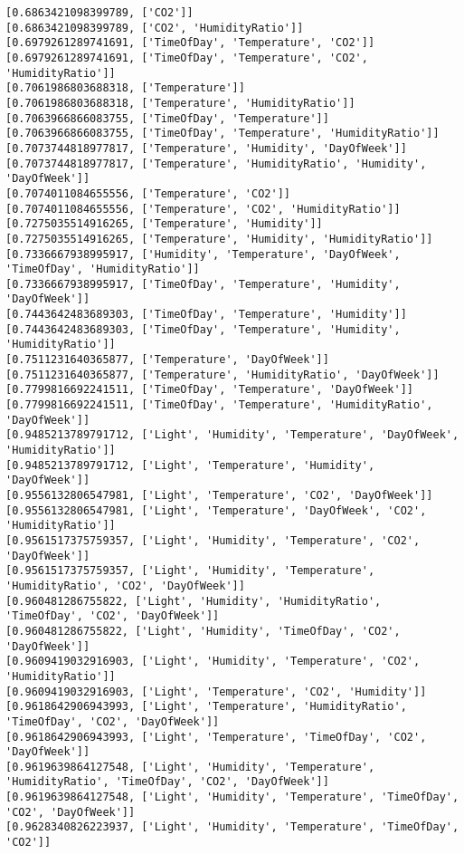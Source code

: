 \documentclass[11pt]{article}
\begin{document}
\begin{Verbatim}[commandchars=\\\{\}]
[0.6863421098399789, ['CO2']]
[0.6863421098399789, ['CO2', 'HumidityRatio']]
[0.6979261289741691, ['TimeOfDay', 'Temperature', 'CO2']]
[0.6979261289741691, ['TimeOfDay', 'Temperature', 'CO2', 'HumidityRatio']]
[0.7061986803688318, ['Temperature']]
[0.7061986803688318, ['Temperature', 'HumidityRatio']]
[0.7063966866083755, ['TimeOfDay', 'Temperature']]
[0.7063966866083755, ['TimeOfDay', 'Temperature', 'HumidityRatio']]
[0.7073744818977817, ['Temperature', 'Humidity', 'DayOfWeek']]
[0.7073744818977817, ['Temperature', 'HumidityRatio', 'Humidity', 'DayOfWeek']]
[0.7074011084655556, ['Temperature', 'CO2']]
[0.7074011084655556, ['Temperature', 'CO2', 'HumidityRatio']]
[0.7275035514916265, ['Temperature', 'Humidity']]
[0.7275035514916265, ['Temperature', 'Humidity', 'HumidityRatio']]
[0.7336667938995917, ['Humidity', 'Temperature', 'DayOfWeek', 'TimeOfDay', 'HumidityRatio']]
[0.7336667938995917, ['TimeOfDay', 'Temperature', 'Humidity', 'DayOfWeek']]
[0.7443642483689303, ['TimeOfDay', 'Temperature', 'Humidity']]
[0.7443642483689303, ['TimeOfDay', 'Temperature', 'Humidity', 'HumidityRatio']]
[0.7511231640365877, ['Temperature', 'DayOfWeek']]
[0.7511231640365877, ['Temperature', 'HumidityRatio', 'DayOfWeek']]
[0.7799816692241511, ['TimeOfDay', 'Temperature', 'DayOfWeek']]
[0.7799816692241511, ['TimeOfDay', 'Temperature', 'HumidityRatio', 'DayOfWeek']]
[0.9485213789791712, ['Light', 'Humidity', 'Temperature', 'DayOfWeek', 'HumidityRatio']]
[0.9485213789791712, ['Light', 'Temperature', 'Humidity', 'DayOfWeek']]
[0.9556132806547981, ['Light', 'Temperature', 'CO2', 'DayOfWeek']]
[0.9556132806547981, ['Light', 'Temperature', 'DayOfWeek', 'CO2', 'HumidityRatio']]
[0.9561517375759357, ['Light', 'Humidity', 'Temperature', 'CO2', 'DayOfWeek']]
[0.9561517375759357, ['Light', 'Humidity', 'Temperature', 'HumidityRatio', 'CO2', 'DayOfWeek']]
[0.960481286755822, ['Light', 'Humidity', 'HumidityRatio', 'TimeOfDay', 'CO2', 'DayOfWeek']]
[0.960481286755822, ['Light', 'Humidity', 'TimeOfDay', 'CO2', 'DayOfWeek']]
[0.9609419032916903, ['Light', 'Humidity', 'Temperature', 'CO2', 'HumidityRatio']]
[0.9609419032916903, ['Light', 'Temperature', 'CO2', 'Humidity']]
[0.9618642906943993, ['Light', 'Temperature', 'HumidityRatio', 'TimeOfDay', 'CO2', 'DayOfWeek']]
[0.9618642906943993, ['Light', 'Temperature', 'TimeOfDay', 'CO2', 'DayOfWeek']]
[0.9619639864127548, ['Light', 'Humidity', 'Temperature', 'HumidityRatio', 'TimeOfDay', 'CO2', 'DayOfWeek']]
[0.9619639864127548, ['Light', 'Humidity', 'Temperature', 'TimeOfDay', 'CO2', 'DayOfWeek']]
[0.9628340826223937, ['Light', 'Humidity', 'Temperature', 'TimeOfDay', 'CO2']]

\end{Verbatim}
\end{document}
